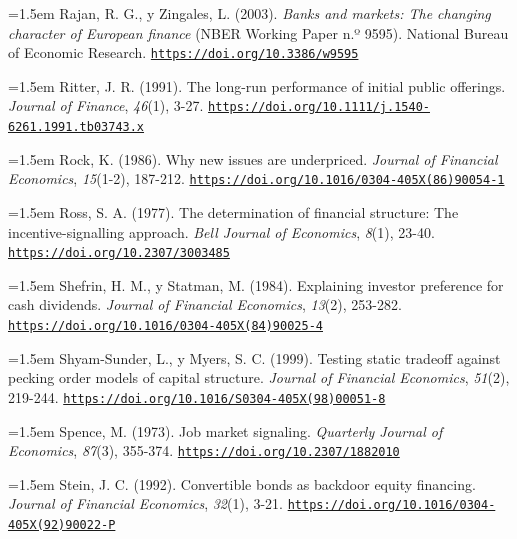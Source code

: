 \documentclass[10pt,a4paper]{article}
\begin{document}
\noindent\hangindent=1.5em Rajan, R. G., y Zingales, L. (2003). \textit{Banks and markets: The changing character of European finance} (NBER Working Paper n.º 9595). National Bureau of Economic Research. \href{https://doi.org/10.3386/w9595}{\nolinkurl{https://doi.org/10.3386/w9595}}

\noindent\hangindent=1.5em Ritter, J. R. (1991). The long-run performance of initial public offerings. \textit{Journal of Finance}, \textit{46}(1), 3-27. \href{https://doi.org/10.1111/j.1540-6261.1991.tb03743.x}{\nolinkurl{https://doi.org/10.1111/j.1540-6261.1991.tb03743.x}}

\noindent\hangindent=1.5em Rock, K. (1986). Why new issues are underpriced. \textit{Journal of Financial Economics}, \textit{15}(1-2), 187-212. \href{https://doi.org/10.1016/0304-405X(86)90054-1}{\nolinkurl{https://doi.org/10.1016/0304-405X(86)90054-1}}

\noindent\hangindent=1.5em Ross, S. A. (1977). The determination of financial structure: The incentive-signalling approach. \textit{Bell Journal of Economics}, \textit{8}(1), 23-40. \href{https://doi.org/10.2307/3003485}{\nolinkurl{https://doi.org/10.2307/3003485}}

\noindent\hangindent=1.5em Shefrin, H. M., y Statman, M. (1984). Explaining investor preference for cash dividends. \textit{Journal of Financial Economics}, \textit{13}(2), 253-282. \href{https://doi.org/10.1016/0304-405X(84)90025-4}{\nolinkurl{https://doi.org/10.1016/0304-405X(84)90025-4}}

\noindent\hangindent=1.5em Shyam-Sunder, L., y Myers, S. C. (1999). Testing static tradeoff against pecking order models of capital structure. \textit{Journal of Financial Economics}, \textit{51}(2), 219-244. \href{https://doi.org/10.1016/S0304-405X(98)00051-8}{\nolinkurl{https://doi.org/10.1016/S0304-405X(98)00051-8}}

\noindent\hangindent=1.5em Spence, M. (1973). Job market signaling. \textit{Quarterly Journal of Economics}, \textit{87}(3), 355-374. \href{https://doi.org/10.2307/1882010}{\nolinkurl{https://doi.org/10.2307/1882010}}

\noindent\hangindent=1.5em Stein, J. C. (1992). Convertible bonds as backdoor equity financing. \textit{Journal of Financial Economics}, \textit{32}(1), 3-21. \href{https://doi.org/10.1016/0304-405X(92)90022-P}{\nolinkurl{https://doi.org/10.1016/0304-405X(92)90022-P}}
\end{document}
